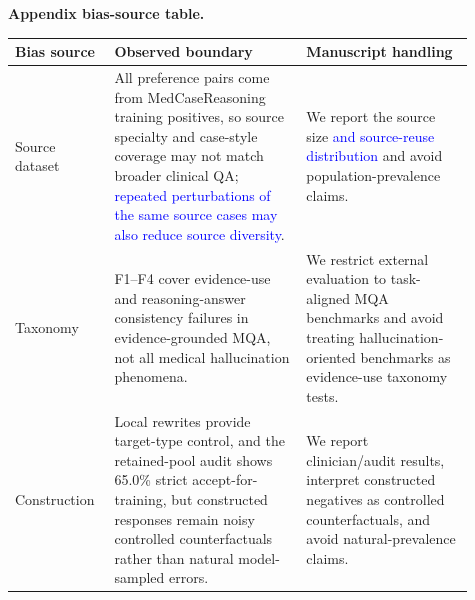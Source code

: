 \documentclass[12pt]{article}
\newcommand{\added}[1]{\textcolor{blue}{#1}}
\begin{document}
\textbf{Appendix bias-source table.}
\begin{displayquote}
\captionof{table}{\added{Main dataset-bias sources and how they are handled in the revised manuscript.}}
\begin{adjustbox}{max width=\linewidth}
\begin{tabular}{L{0.18\linewidth}L{0.39\linewidth}L{0.34\linewidth}}
\toprule
\textbf{Bias source} & \textbf{Observed boundary} & \textbf{Manuscript handling} \\
\midrule
Source dataset & All preference pairs come from MedCaseReasoning training positives, so source specialty and case-style coverage may not match broader clinical QA; \added{repeated perturbations of the same source cases may also reduce source diversity}. & We report the source size \added{and source-reuse distribution} and avoid population-prevalence claims. \\
Taxonomy & F1--F4 cover evidence-use and reasoning-answer consistency failures in evidence-grounded MQA, not all medical hallucination phenomena. & We restrict external evaluation to task-aligned MQA benchmarks and avoid treating hallucination-oriented benchmarks as evidence-use taxonomy tests. \\
Construction & Local rewrites provide target-type control, and the retained-pool audit shows 65.0\% strict accept-for-training, but constructed responses remain noisy controlled counterfactuals rather than natural model-sampled errors. & We report clinician/audit results, interpret constructed negatives as controlled counterfactuals, and avoid natural-prevalence claims. \\
\bottomrule
\end{tabular}
\end{adjustbox}
\end{displayquote}
\end{document}
